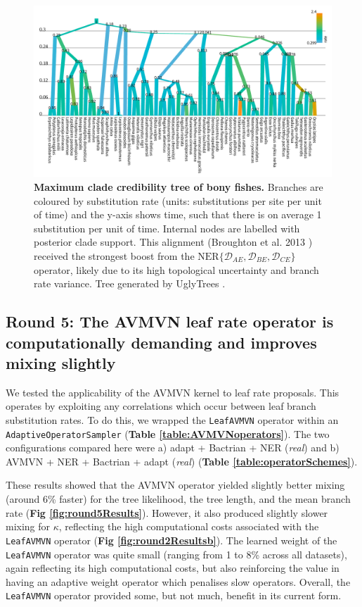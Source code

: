 \documentclass[10pt,letterpaper]{article}
\begin{document}
\begin{figure}[!h]
\includegraphics[width=\textwidth]{Figures/broughton.pdf}
\caption{\textbf{Maximum clade credibility tree of bony fishes.} 
Branches are coloured by substitution rate (units: substitutions per site per unit of time) and the y-axis shows time, such that there is on average 1 substitution per unit of time.
Internal nodes are labelled with posterior clade support. 
This alignment (Broughton et al. 2013 \cite{Broughton_2013}) received the strongest boost from the $\text{NER}\{\mathcal{D}_{AE}, \mathcal{D}_{BE}, \mathcal{D}_{CE}\}$ operator, likely due to its high topological uncertainty and branch rate variance.   
Tree generated by UglyTrees \cite{uglytrees}.  }
\label{fig:parameterisationResults}
\end{figure}




\subsection*{Round 5: The AVMVN leaf rate operator is computationally demanding and improves mixing slightly}


We tested the applicability of the AVMVN kernel to leaf rate proposals.
This operates by exploiting any correlations which occur between leaf branch substitution rates.
To do this, we wrapped the \texttt{LeafAVMVN} operator within an \texttt{AdaptiveOperatorSampler} (\textbf{Table \ref{table:AVMVNoperators}}).
The two configurations compared here were a) adapt + Bactrian + NER (\textit{real}) and b) AVMVN + NER + Bactrian + adapt (\textit{real})  (\textbf{Table \ref{table:operatorSchemes}}).


These results showed that the AVMVN operator yielded slightly better mixing (around 6\% faster) for the tree likelihood, the tree length, and the mean branch rate (\textbf{Fig \ref{fig:round5Results}}).
However, it also produced slightly slower mixing for $\kappa$, reflecting the high computational costs associated with the \texttt{LeafAVMVN} operator (\textbf{Fig \ref{fig:round2Resultsb}}).
The learned weight of the \texttt{LeafAVMVN} operator was quite small (ranging from 1 to 8\% across all datasets), again reflecting its high computational costs, but also reinforcing the value in having an adaptive weight operator which penalises slow operators.
Overall, the \texttt{LeafAVMVN} operator provided some, but not much, benefit in its current form. 
\end{document}
